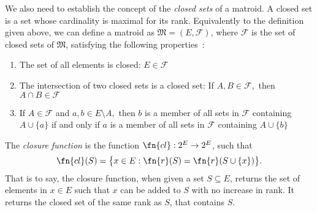 We also need to establish the concept of the \textit{closed sets} of a matroid. A closed set is a set whose cardinality is maximal for its rank. Equivalently to the definition given above, we can define a matroid as $\mathfrak{M} = (E, \mathcal{F})$, where $\mathcal{F}$ is the set of closed sets of $\mathfrak{M}$, satisfying the following properties~\cite{knuth-1975}:

\begin{enumerate}
  \item The set of all elements is closed: $E \in \mathcal{F}$
  \item The intersection of two closed sets is a closed set: If $A,B \in \mathcal{F},$ then $A \cap B \in \mathcal{F}$
  \item If $A \in \mathcal{F}$ and $a,b \in E \setminus A,$ then $b$ is a member of all sets in $\mathcal{F}$ containing $A \cup \{a\}$ if and only if $a$ is a member of all sets in $\mathcal{F}$ containing $A \cup \{b\}$
\end{enumerate}

The \textit{closure function} is the function $\fn{cl} : 2^E \to 2^E$, such that $$\fn{cl}(S) = \bigl\{ x \in E : \fn{r}(S) = \fn{r}(S \cup \{x\}) \bigr\}.$$ That is to say, the closure function, when given a set $S \subseteq E$, returns the set of elements in $x \in E$ such that $x$ can be added to $S$ with no increase in rank. It returns the closed set of the same rank as $S$, that contains $S$.